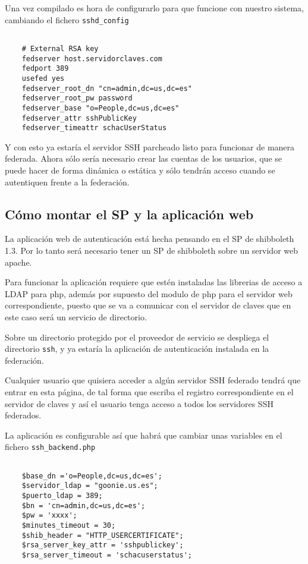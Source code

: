     Una vez compilado es hora de configurarlo para que funcione
    con nuestro sistema, cambiando el fichero \texttt{sshd\_config}

    \begin{verbatim}

    # External RSA key
    fedserver host.servidorclaves.com
    fedport 389
    usefed yes
    fedserver_root_dn "cn=admin,dc=us,dc=es"
    fedserver_root_pw password
    fedserver_base "o=People,dc=us,dc=es"
    fedserver_attr sshPublicKey
    fedserver_timeattr schacUserStatus

    \end{verbatim}

    Y con esto ya estaría el servidor SSH parcheado listo para
    funcionar de manera federada. Ahora sólo sería necesario crear
    las cuentas de los usuarios, que se puede hacer de forma
    dinámica o estática y sólo tendrán acceso cuando se
    autentiquen frente a la federación.

\subsection{Cómo montar el SP y la aplicación web}

    La aplicación web de autenticación está hecha pensando en el
    SP de shibboleth 1.3. Por lo tanto será necesario tener un SP
    de shibboleth sobre un servidor web apache.

    Para funcionar la aplicación requiere que estén instaladas
    las librerias de acceso a LDAP para php, además por supuesto del
    modulo de php para el servidor web correspondiente, puesto que se va a
    comunicar con el servidor de claves que en este caso será un
    servicio de directorio.
    
    Sobre un directorio protegido por el proveedor de servicio se
    despliega el directorio \texttt{ssh}, y ya estaría la aplicación
    de autenticación instalada en la federación.

    Cualquier usuario que quisiera acceder a algún servidor SSH
    federado tendrá que entrar en esta página, de tal forma que
    escriba el registro correspondiente en el servidor de claves
    y así el usuario tenga acceso a todos los servidores SSH
    federados.

    La aplicación es configurable así que habrá que cambiar unas
    variables en el fichero \texttt{ssh\_backend.php}

    \begin{verbatim}

    $base_dn ='o=People,dc=us,dc=es';
    $servidor_ldap = "goonie.us.es";
    $puerto_ldap = 389;
    $bn = 'cn=admin,dc=us,dc=es';
    $pw = 'xxxx';
    $minutes_timeout = 30;
    $shib_header = "HTTP_USERCERTIFICATE";
    $rsa_server_key_attr = 'sshpublickey';
    $rsa_server_timeout = 'schacuserstatus';

    \end{verbatim}

